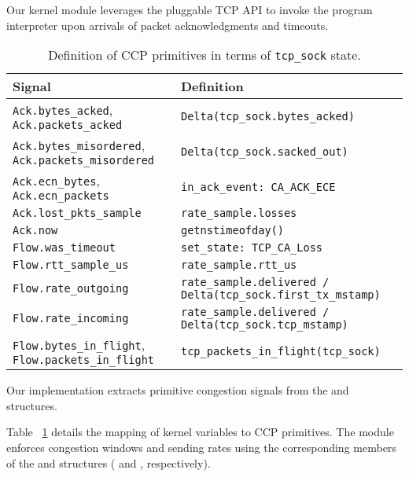 Our kernel module leverages the pluggable TCP API to invoke the program
interpreter upon arrivals of packet acknowledgments and timeouts.
%
\begin{table}
    \centering
    \footnotesize
    \begin{tabular}{p{}p{}}
        \textbf{Signal} & \textbf{Definition} \\
        \hline
        \texttt{Ack.bytes\_acked}, \texttt{Ack.packets\_acked}             & \texttt{Delta(tcp\_sock.bytes\_acked)} \\
        \texttt{Ack.bytes\_misordered}, \texttt{Ack.packets\_misordered}   & \texttt{Delta(tcp\_sock.sacked\_out)} \\
        \texttt{Ack.ecn\_bytes}, \texttt{Ack.ecn\_packets}                 & \texttt{in\_ack\_event: CA\_ACK\_ECE} \\
        \texttt{Ack.lost\_pkts\_sample}                                    & \texttt{rate\_sample.losses} \\
        \texttt{Ack.now}                                                   & \texttt{getnstimeofday()}\\
        \texttt{Flow.was\_timeout}                                         & \texttt{set\_state: TCP\_CA\_Loss} \\
        \texttt{Flow.rtt\_sample\_us}                                      & \texttt{rate\_sample.rtt\_us} \\
        \texttt{Flow.rate\_outgoing}                                       & \texttt{rate\_sample.delivered / Delta(tcp\_sock.first\_tx\_mstamp)} \\
        \texttt{Flow.rate\_incoming}                                       & \texttt{rate\_sample.delivered / Delta(tcp\_sock.tcp\_mstamp)}  \\
        \texttt{Flow.bytes\_in\_flight}, \texttt{Flow.packets\_in\_flight} & \texttt{tcp\_packets\_in\_flight(tcp\_sock)} \\
    \end{tabular}
    \caption{Definition of CCP primitives in terms of \texttt{tcp\_sock} state.}\label{tab:api:kernel}
\end{table}
Our implementation extracts primitive congestion signals from the
 and  structures.

Table ~\ref{tab:api:kernel} details the mapping of kernel variables
to CCP primitives.
%
The module enforces congestion windows and sending rates using the corresponding
members of the  and  structures ( and
, respectively).

